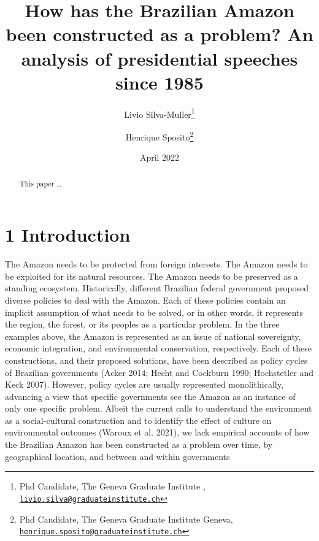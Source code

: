 \documentclass[
]{article}
\title{How has the Brazilian Amazon been constructed as a problem? An
analysis of presidential speeches since 1985}
\author{Livio Silva-Muller\footnote{Phd Candidate, The Geneva Graduate
  Institute ,
  \href{mailto:livio.silva@graduateinstitute.ch}{\nolinkurl{livio.silva@graduateinstitute.ch}}} \and Henrique
Sposito\footnote{Phd Candidate, The Geneva Graduate Institute Geneva,
  \href{mailto:henrique.sposito@graduateinstitute.ch}{\nolinkurl{henrique.sposito@graduateinstitute.ch}}}}
\date{April 2022}
\begin{document}
\maketitle
\begin{abstract}
This paper \ldots{}
\end{abstract}

\pagebreak

\hypertarget{introduction}{%
\section{1 Introduction}\label{introduction}}

The Amazon needs to be protected from foreign interests. The Amazon
needs to be exploited for its natural resources. The Amazon needs to be
preserved as a standing ecosystem. Historically, different Brazilian
federal government proposed diverse policies to deal with the Amazon.
Each of these policies contain an implicit assumption of what needs to
be solved, or in other words, it represents the region, the forest, or
its peoples as a particular problem. In the three examples above, the
Amazon is represented as an issue of national sovereignty, economic
integration, and environmental conservation, respectively. Each of these
constructions, and their proposed solutions, have been described as
policy cycles of Brazilian governments (Acker 2014; Hecht and Cockburn
1990; Hochstetler and Keck 2007). However, policy cycles are usually
represented monolithically, advancing a view that specific governments
see the Amazon as an instance of only one specific problem. Albeit the
current calls to understand the environment as a social-cultural
construction and to identify the effect of culture on environmental
outcomes (Waroux et al. 2021), we lack empirical accounts of how the
Brazilian Amazon has been constructed as a problem over time, by
geographical location, and between and within governments
\end{document}
